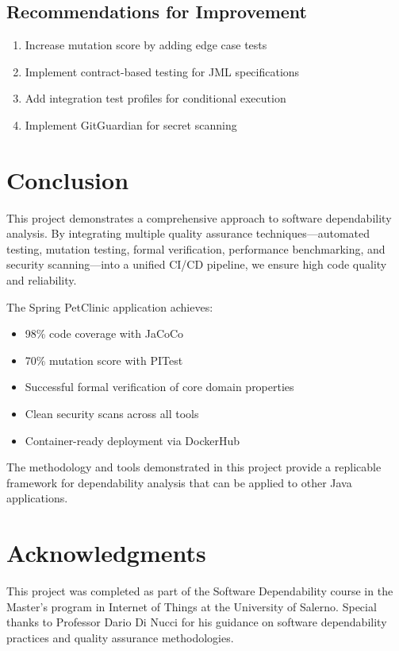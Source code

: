 \documentclass[sigconf]{acmart}
\begin{document}
\subsection{Recommendations for Improvement}

\begin{enumerate}
    \item Increase mutation score by adding edge case tests
    \item Implement contract-based testing for JML specifications
    \item Add integration test profiles for conditional execution
    \item Implement GitGuardian for secret scanning
\end{enumerate}

\section{Conclusion}

This project demonstrates a comprehensive approach to software dependability analysis. By integrating multiple quality assurance techniques—automated testing, mutation testing, formal verification, performance benchmarking, and security scanning—into a unified CI/CD pipeline, we ensure high code quality and reliability.

The Spring PetClinic application achieves:
\begin{itemize}
    \item 98\% code coverage with JaCoCo
    \item 70\% mutation score with PITest
    \item Successful formal verification of core domain properties
    \item Clean security scans across all tools
    \item Container-ready deployment via DockerHub
\end{itemize}

The methodology and tools demonstrated in this project provide a replicable framework for dependability analysis that can be applied to other Java applications.

\section*{Acknowledgments}

This project was completed as part of the Software Dependability course in the Master's program in Internet of Things at the University of Salerno. Special thanks to Professor Dario Di Nucci for his guidance on software dependability practices and quality assurance methodologies.
\end{document}
